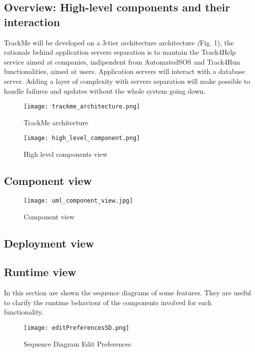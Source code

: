 \documentclass[../main.tex]{subfiles}
\begin{document}
\subsection{Overview: High-level components and their interaction}
 TrackMe will be developed on a 3-tier architecture architecture \textit(Fig. 1), the rationale behind application servers separation is to mantain the Track4Help service
 aimed at companies, indipendent from AutomatedSOS and Track4Run functionalities, aimed at users. Application servers will interact with a database server. Adding a layer of complexity with servers separation will  make possible to handle failures and updates without the whole system going down.


\begin{figure}[ht]
\centering
     \texttt{[image: trackme\_architecture.png]}
      \caption{TrackMe architecture}
       \label{fig:trackme_architecture}
\end{figure}

\begin{figure}[ht]
    \centering
         \texttt{[image: high\_level\_component.png]}
          \caption{High level components view}
           \label{fig:high_level_components}
\end{figure}

\newpage
\thispagestyle{empty} %
\subsection{Component view}
\begin{figure}[H]
	\texttt{[image: uml\_component\_view.jpg]}
	\caption{Component view}
	\label{fig:uml_component_view}
\end{figure}
\newpage

\subsection{Deployment view}

\subsection{Runtime view}
In this section are shown the sequence diagrams of some features. They are useful to clarify the runtime behaviour of the components involved for each functionality.
\begin{figure}[h]
        \centering
             \texttt{[image: editPreferencesSD.png]}
              \caption{Sequence Diagram Edit Preferences }
               \label{fig:editPreferencesSD}
\end{figure}
\end{document}
